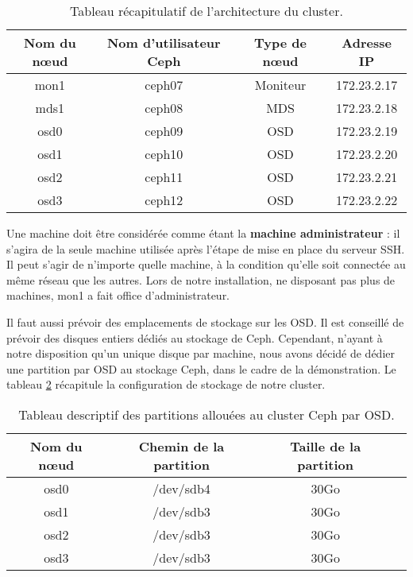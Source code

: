 \begin{table}[H]
  \begin{center}
    \begin{tabular}{|c|c|c|c|}
       \hline
       Nom du nœud & Nom d'utilisateur Ceph & Type de nœud & Adresse IP\\
       \hline
       mon1 & ceph07 & Moniteur &  172.23.2.17 \\
       \hline
       mds1 & ceph08 & MDS &  172.23.2.18 \\
       \hline
       osd0 & ceph09 & OSD &  172.23.2.19 \\
       \hline
       osd1 & ceph10 & OSD &  172.23.2.20 \\
       \hline
       osd2 & ceph11 & OSD &  172.23.2.21 \\
       \hline
       osd3 & ceph12 & OSD &  172.23.2.22 \\
       \hline
    \end{tabular}
  \end{center}
  \caption{Tableau récapitulatif de l'architecture du cluster.}
  \label{tableau_cluster}
\end{table}

\begin{WarningBox}
Une machine doit être considérée comme étant la \textbf{machine administrateur} : il s'agira de la seule machine utilisée après l'étape de mise en place du serveur SSH. Il peut s'agir de n'importe quelle machine, à la condition qu'elle soit connectée au même réseau que les autres. Lors de notre installation, ne disposant pas plus de machines, mon1 a fait office d'administrateur.
\end{WarningBox}

Il faut aussi prévoir des emplacements de stockage sur les OSD. Il est conseillé de prévoir des disques entiers dédiés au stockage de Ceph. Cependant, n'ayant à notre disposition qu'un unique disque par machine, nous avons décidé de dédier une partition par OSD au stockage Ceph, dans le cadre de la démonstration. Le tableau \ref{tableau_osd} récapitule la configuration de stockage de notre cluster.

\begin{table}[H]
  \begin{center}
    \begin{tabular}{|c|c|c|c|}
       \hline
       Nom du nœud & Chemin de la partition & Taille de la partition\\
       \hline
       osd0 & /dev/sdb4 & 30Go \\
       \hline
       osd1 & /dev/sdb3 & 30Go \\
       \hline
       osd2 & /dev/sdb3 & 30Go \\
       \hline
       osd3 & /dev/sdb3 & 30Go \\
       \hline
    \end{tabular}
  \end{center}
  \caption{Tableau descriptif des partitions allouées au cluster Ceph par OSD.}
  \label{tableau_osd}
\end{table}

